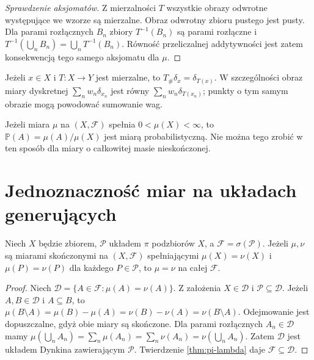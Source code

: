 \begin{proof}[Sprawdzenie aksjomatów]
Z mierzalności $T$ wszystkie obrazy odwrotne występujące
we wzorze są mierzalne. Obraz odwrotny zbioru pustego
jest pusty. Dla parami rozłącznych $B_n$ zbiory
$T^{-1}(B_n)$ są parami rozłączne i
$T^{-1}(\bigcup_nB_n)=\bigcup_nT^{-1}(B_n)$.
Równość przeliczalnej addytywności jest zatem konsekwencją
tego samego aksjomatu dla $\mu$.
\end{proof}

\begin{przyklad}
Jeżeli $x\in X$ i $T:X\to Y$ jest mierzalne, to
$T_\#\delta_x=\delta_{T(x)}$.
W szczególności obraz miary dyskretnej
$\sum_nw_n\delta_{x_n}$ jest równy
$\sum_nw_n\delta_{T(x_n)}$; punkty o tym samym obrazie
mogą powodować sumowanie wag.
\end{przyklad}

\begin{przyklad}[Normalizacja]
Jeżeli miara $\mu$ na $(X,\mathcal F)$ spełnia
$0<\mu(X)<\infty$, to $\mathbb P(A)=\mu(A)/\mu(X)$
jest miarą probabilistyczną. Nie można tego zrobić
w ten sposób dla miary o całkowitej masie nieskończonej.
\end{przyklad}

\section{Jednoznaczność miar na układach generujących}

\begin{twierdzenie}
\label{thm:uniqueness-finite}
Niech $X$ będzie zbiorem, $\mathcal P$ układem $\pi$
podzbiorów $X$, a $\mathcal F=\sigma(\mathcal P)$.
Jeżeli $\mu,\nu$ są miarami skończonymi na $(X,\mathcal F)$
spełniającymi $\mu(X)=\nu(X)$ i
$\mu(P)=\nu(P)$ dla każdego $P\in\mathcal P$,
to $\mu=\nu$ na całej $\mathcal F$.
\end{twierdzenie}
\begin{proof}
Niech $\mathcal D=\{A\in\mathcal F:\mu(A)=\nu(A)\}$.
Z założenia $X\in\mathcal D$ i $\mathcal P\subseteq\mathcal D$.
Jeżeli $A,B\in\mathcal D$ i $A\subseteq B$, to
$\mu(B\setminus A)=\mu(B)-\mu(A)
=\nu(B)-\nu(A)=\nu(B\setminus A)$.
Odejmowanie jest dopuszczalne, gdyż obie miary są skończone.
Dla parami rozłącznych $A_n\in\mathcal D$ mamy
$\mu(\bigcup_nA_n)=\sum_n\mu(A_n)
=\sum_n\nu(A_n)=\nu(\bigcup_nA_n)$.
Zatem $\mathcal D$ jest układem Dynkina zawierającym
$\mathcal P$. Twierdzenie \ref{thm:pi-lambda} daje
$\mathcal F\subseteq\mathcal D$.
\end{proof}


